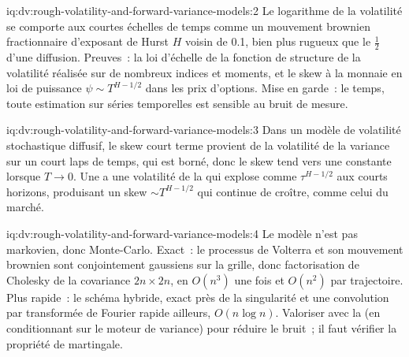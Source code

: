 \begin{solution}{iq:dv:rough-volatility-and-forward-variance-models:2}
Le logarithme de la volatilité se comporte aux courtes échelles de temps comme un mouvement brownien fractionnaire d'exposant de Hurst $H$ voisin de 0.1, bien
plus rugueux que le $\frac12$ d'une diffusion. Preuves~: la loi d'échelle de la fonction de structure de la volatilité réalisée
sur de nombreux indices et moments, et le skew à la monnaie en loi de puissance $\psi\sim T^{H-1/2}$ dans les prix d'options. Mise en garde~: le
temps, toute estimation sur séries temporelles est sensible au bruit de mesure.
\end{solution}

\begin{solution}{iq:dv:rough-volatility-and-forward-variance-models:3}
Dans un modèle de volatilité stochastique diffusif, le skew court terme provient de la volatilité de la variance sur un court laps de temps,
qui est borné, donc le skew tend vers une constante lorsque $T\to0$. Une  a une volatilité de la
 qui explose comme $\tau^{H-1/2}$ aux courts horizons, produisant un skew $\sim T^{H-1/2}$ qui continue
de croître, comme celui du marché.
\end{solution}

\begin{solution}{iq:dv:rough-volatility-and-forward-variance-models:4}
Le modèle n'est pas markovien, donc Monte-Carlo. Exact~: le processus de Volterra et son mouvement brownien sont conjointement gaussiens sur
la grille, donc factorisation de Cholesky de la covariance $2n\times2n$, en $O(n^3)$ une fois et $O(n^2)$ par trajectoire. Plus rapide~: le schéma hybride,
exact près de la singularité et une convolution par transformée de Fourier rapide ailleurs, $O(n\log n)$. Valoriser avec la 
(en conditionnant sur le moteur de variance) pour réduire le bruit~; il faut vérifier la propriété de martingale.
\end{solution}

